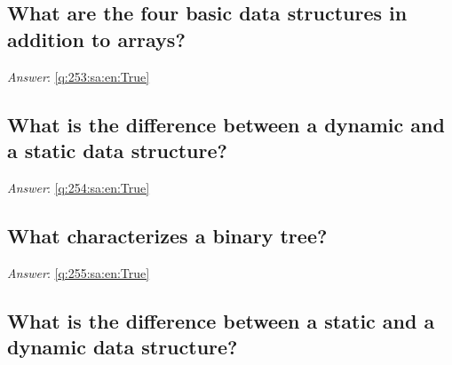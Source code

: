 \documentclass[a4paper,11pt,oneside]{article}
\begin{document}
\begin{sloppypar}
\subsection{What are the four basic data structures in addition to arrays?}

\label{q:253:sa:en:False}

\vspace{2cm}

\noindent\makebox[\textwidth]{\hrulefill}

\vspace{1cm}

\textit{Answer}: \autoref{q:253:sa:en:True}



\subsection{What is the difference between a dynamic and a static data structure?}

\label{q:254:sa:en:False}

\vspace{2cm}

\noindent\makebox[\textwidth]{\hrulefill}

\vspace{1cm}

\textit{Answer}: \autoref{q:254:sa:en:True}



\subsection{What characterizes a binary tree?}

\label{q:255:sa:en:False}

\vspace{2cm}

\noindent\makebox[\textwidth]{\hrulefill}

\vspace{1cm}

\textit{Answer}: \autoref{q:255:sa:en:True}



\subsection{What is the difference between a static and a dynamic data structure?}

\label{q:256:sa:en:False}

\vspace{2cm}


\end{sloppypar}
\end{document}
